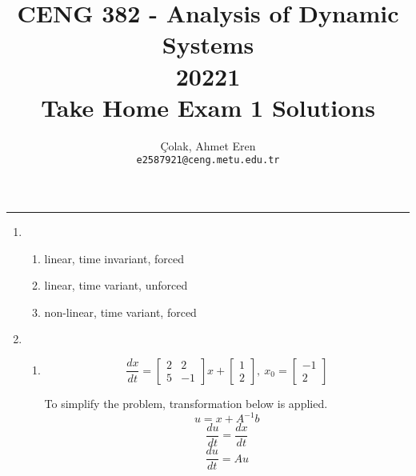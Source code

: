 \documentclass[12pt,a4paper, margin=1in]{article}
\author{Çolak, Ahmet Eren\\ \texttt{e2587921@ceng.metu.edu.tr}}
\title{CENG 382 - Analysis of Dynamic Systems \\
20221\\
Take Home Exam 1 Solutions}
\begin{document}
\maketitle

\noindent\rule{19cm}{1.2pt}

\begin{enumerate}

    \item %
        \begin{enumerate}
            \item linear, time invariant, forced
            \item linear, time variant, unforced
            \item non-linear, time variant, forced
        \end{enumerate}

    \item %
        \begin{enumerate}
            \item 
            \begin{equation*}
                \frac{dx}{dt} = \begin{bmatrix}
                    2 & 2 \\
                    5 & -1
                \end{bmatrix} x + \begin{bmatrix}
                    1 \\ 2
                \end{bmatrix}, \ x_0 = \begin{bmatrix}
                    -1 \\ 2
                \end{bmatrix}
            \end{equation*}
            \newline

            To simplify the problem, transformation below is applied.
            \begin{equation*}
                u = x + A^{-1}b
            \end{equation*}
            \begin{equation*}
                \frac{du}{dt} = \frac{dx}{dt}
            \end{equation*}
            \begin{equation*}
                \frac{du}{dt} = Au
            \end{equation*}


\end{enumerate}
\end{enumerate}
\end{document}
